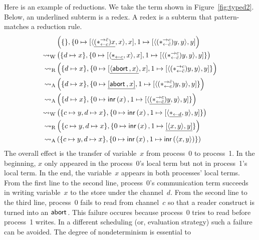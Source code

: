 {\begin{example}
 Here is an example of reductions.  We take the term shown in
 Figure~\ref{fig:typed2}.
 Below, an underlined subterm is a redex.  A redex is a subterm that
 pattern-matches a reduction rule.
 \begin{align*}
  &\left(\{\}, \{
  0\mapsto[{\langle{\underline{(\ast^{\rightarrow {\bar{c}}}_{\leftarrow{c}})x},x}\rangle,x}],
  1\mapsto[{\langle{           (\ast^{\rightarrow {c}}_{\leftarrow{\bar{c}}})y ,y}\rangle,y}]
  \right)
  \\   \rightsquigarrow_{\mathrm W} &
  \left( \{d\mapsto x\},
  \{
  0\mapsto [{{\langle{\underline{\ast_{\leftarrow{c}}},  x}\rangle}, x}],
  1\mapsto [{           \langle{(\ast^{\rightarrow {c}}_{\leftarrow{\bar{c}}})y,y}\rangle,y}]
  \}
  \right)
  \\ \rightsquigarrow_{\mathrm R} &
  \left( \{d\mapsto x\},
  \{
  0\mapsto [{\underline{\langle{\mathsf{abort\,},  x}\rangle}, x}],
  1\mapsto [{           \langle{(\ast^{\rightarrow {c}}_{\leftarrow{\bar{c}}})y,y}\rangle,y}]
  \}
  \right)
  \\
  \rightsquigarrow_{\mathrm A} &
  \left(
  \{d\mapsto x\},
  \{
  0\mapsto\underline{[{\mathsf{abort\,},x}]},
  1\mapsto{[{\langle{(\ast^{\rightarrow {\bar{c}}}_{\leftarrow{c}})y,y}\rangle,y}]}
  \}
  \right)
  \\
  \rightsquigarrow_{\mathrm A} &
  \left(\{d\mapsto x\},
  \{
  0\mapsto\mathsf{inr}\left({x}\right),
  1\mapsto[{\langle{\underline{(\ast^{\rightarrow {c}}_{\leftarrow{\bar{c}}})y},y}\rangle,y}]
  \}
  \right)
  \\
  \rightsquigarrow_{\mathrm W} &
  \left(
  \{c\mapsto y, d\mapsto x\}
  ,
  \{
  0\mapsto \mathsf{inr}\left({x}\right),
  1\mapsto [{\langle{\underline{\ast_{\leftarrow{d}}}, y}\rangle, y}]
  \}
  \right)
  \\
  \rightsquigarrow_{\mathrm R} &
  \left(
  \{c\mapsto y, d\mapsto x\}
  ,
  \{
  0\mapsto \mathsf{inr}\left({x}\right),
  1\mapsto \underline{[{\langle{x,y}\rangle,y}]}
  \}
  \right)
  \\
  \rightsquigarrow_{\mathrm A} &
  \left(
  \{c\mapsto y, d\mapsto x\}
  ,
  \{
  0\mapsto \mathsf{inr}\left({x}\right),
  1\mapsto \mathsf{inr}\left({\langle{x,y}\rangle}\right)
  \}
  \right)
 \end{align*}
 The overall effect is the transfer of variable~$x$ from process~0 to
 process~1.  In the beginning, $x$ only appeared in the process~0's
 local term but not in process~1's local term.  In the end, the
 variable~$x$ appears in both processes' local terms.
 From the first line to the second line,
 process~0's communication term succeeds in writing variable~$x$ to the
 store under the channel~$d$.
 From the second line to the third line, process~0 fails to read from
 channel~$c$ so that a reader construct is turned into an $\mathsf{abort\,}$.
 This failure occures because process~0 tries to read before process~1
 writes.  In a different scheduling (or, evaluation strategy) such a
 failure can be avoided.  The degree of nondeterminism is essential to

\end{example}}
